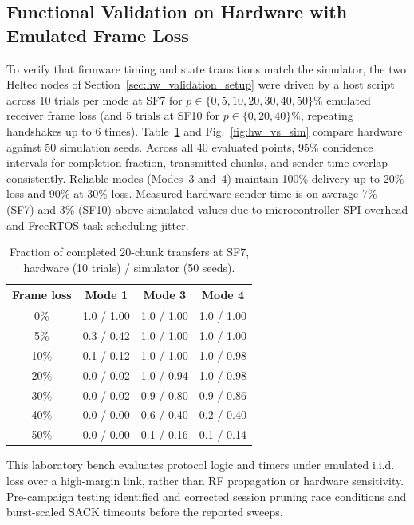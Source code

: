 \documentclass[journal]{IEEEtran}
\begin{document}
\subsection{Functional Validation on Hardware with Emulated Frame Loss}
\label{sec:hw_validation}
To verify that firmware timing and state transitions match the simulator, the two Heltec nodes of Section~\ref{sec:hw_validation_setup} were driven by a host script across 10 trials per mode at SF7 for $p \in \{0,5,10,20,30,40,50\}\%$ emulated receiver frame loss (and 5 trials at SF10 for $p \in \{0,20,40\}\%$, repeating handshakes up to 6 times). Table~\ref{tab:hwsim} and Fig.~\ref{fig:hw_vs_sim} compare hardware against 50 simulation seeds. Across all 40 evaluated points, 95\% confidence intervals for completion fraction, transmitted chunks, and sender time overlap consistently. Reliable modes (Modes~3 and~4) maintain 100\% delivery up to 20\% loss and 90\% at 30\% loss. Measured hardware sender time is on average 7\% (SF7) and 3\% (SF10) above simulated values due to microcontroller SPI overhead and FreeRTOS task scheduling jitter.

\begin{table}[htpb]
\centering
\caption{Fraction of completed 20-chunk transfers at SF7, hardware (10 trials) / simulator (50 seeds).}
\label{tab:hwsim}
\renewcommand{\arraystretch}{1.0}
\footnotesize
\begin{tabular}{|c|c|c|c|}
\hline
\textbf{Frame loss} & \textbf{Mode 1} & \textbf{Mode 3} & \textbf{Mode 4} \\ \hline
0\% & 1.0 / 1.00 & 1.0 / 1.00 & 1.0 / 1.00 \\ \hline
5\% & 0.3 / 0.42 & 1.0 / 1.00 & 1.0 / 1.00 \\ \hline
10\% & 0.1 / 0.12 & 1.0 / 1.00 & 1.0 / 0.98 \\ \hline
20\% & 0.0 / 0.02 & 1.0 / 0.94 & 1.0 / 0.98 \\ \hline
30\% & 0.0 / 0.02 & 0.9 / 0.80 & 0.9 / 0.86 \\ \hline
40\% & 0.0 / 0.00 & 0.6 / 0.40 & 0.2 / 0.40 \\ \hline
50\% & 0.0 / 0.00 & 0.1 / 0.16 & 0.1 / 0.14 \\ \hline
\end{tabular}
\end{table}

This laboratory bench evaluates protocol logic and timers under emulated i.i.d. loss over a high-margin link, rather than RF propagation or hardware sensitivity. Pre-campaign testing identified and corrected session pruning race conditions and burst-scaled SACK timeouts before the reported sweeps.
\end{document}
